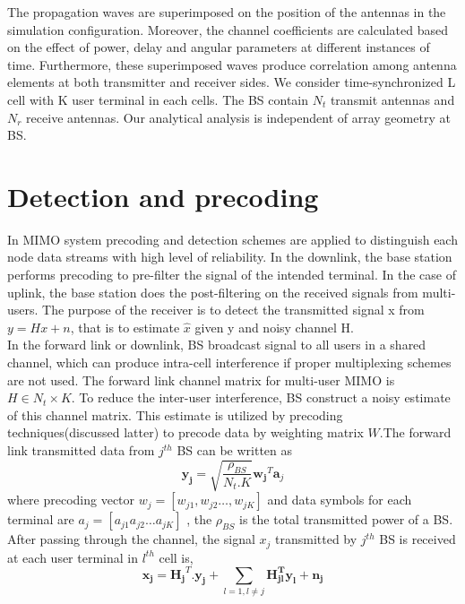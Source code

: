 The propagation waves are superimposed on the position of the antennas in the simulation configuration. Moreover, the channel coefficients are calculated based on the effect of power, delay and angular parameters at different instances of time. Furthermore, these superimposed waves produce correlation among antenna elements at both transmitter and receiver sides. We consider time-synchronized L cell with K user terminal in each cells. The BS contain $N_t$ transmit antennas and $N_r$ receive antennas. Our analytical analysis is independent of array geometry at BS.
\section{Detection and precoding }
In MIMO system precoding and detection schemes are applied to distinguish each node data streams with high level of reliability. In the downlink, the base station performs precoding to pre-filter the signal of the intended terminal. In the case of uplink, the base station does the post-filtering on the received signals from multi-users.
The purpose of the receiver is to detect the transmitted signal x from $y=Hx+n$, that is to estimate $\hat{x}$ given y and noisy channel H.\\
In the forward link or downlink, BS broadcast signal to all users in a shared channel, which can produce intra-cell interference if proper multiplexing schemes are not used. The forward link channel matrix for multi-user MIMO is $H \in N_t \times K$. To reduce the inter-user interference, BS  construct a noisy estimate of this channel matrix. This estimate is utilized by precoding techniques(discussed latter) to precode data by weighting matrix $W$.The forward link transmitted data from $j^{th}$ BS can be written as
\begin{equation}
    \mathbf{y_j}= \sqrt{\frac{\rho_{BS}}{N_t.K}} \mathbf{w_j}^T \mathbf{a}_j
\end{equation}
where precoding vector $w_j=[w_{j1},w_{j2}\hdots,w_{jK}]$ and data symbols for each terminal are  $a_j=[a_{j1} a_{j2} \hdots a_{jK}]$
 , the $\rho_{BS}$  is the total transmitted power of a BS. After passing through the channel, the signal $x_j$ transmitted by $j^{th}$ BS is received at each user terminal in $l^{th}$ cell is,
 \begin{equation}
     \mathbf{x_j}= \mathbf{H_j}^T.\mathbf{y_j}+\sum_{l=1,l \neq j} \mathbf{H_{jl}^T y_l+n_j}
     \label{fw_ueq}
 \end{equation}
